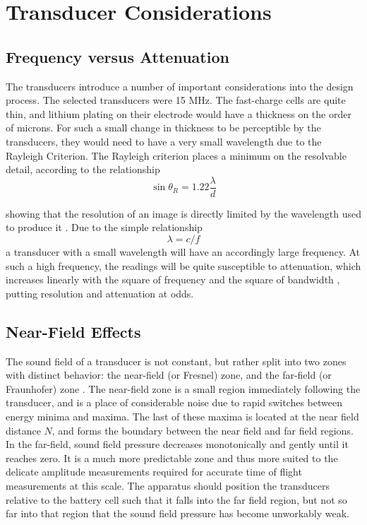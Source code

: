 \section{Transducer Considerations}
\subsection{Frequency versus Attenuation}
The transducers introduce a number of important considerations into the design process.
The selected transducers were 15 MHz. The fast-charge cells are quite thin, and lithium plating on their electrode would have a thickness on the order of microns. 
For such a small change in thickness to be perceptible by the transducers, they would need to have a very small wavelength due to the Rayleigh Criterion. The Rayleigh criterion places a minimum on the resolvable detail, according to the relationship
$$\sin \theta _R = 1.22 \frac{\lambda}{d}$$

showing that the resolution of an image is directly limited by the wavelength used to produce it \cite{RAYLEIGH}.
Due to the simple relationship 
$$ \lambda = c/f$$
a transducer with a small wavelength will have an accordingly large frequency. At such a high frequency, the readings will be quite susceptible to attenuation, which increases linearly with the square of frequency and the square of bandwidth \cite{OLYMPUS}, putting resolution and attenuation at odds. 

\subsection{Near-Field Effects}
The sound field of a transducer is not constant, but rather split into two zones with distinct behavior: the near-field (or Fresnel) zone, and the far-field (or Fraunhofer) zone \cite{OLYMPUS}. 
The near-field zone is a small region immediately following the transducer, and is a place of considerable noise due to rapid switches between energy minima and maxima. 
The last of these maxima is located at the near field distance $N$, and forms the boundary between the near field and far field regions. \cite{OLYMPUS}
In the far-field, sound field pressure decreases monotonically and gently until it reaches zero. \cite{OLYMPUS}
It is a much more predictable zone and thus more suited to the delicate amplitude measurements required for accurate time of flight measurements at this scale.
The apparatus should position the transducers relative to the battery cell such that it falls into the far field region, but not so far into that region that the sound field pressure has become unworkably weak.

